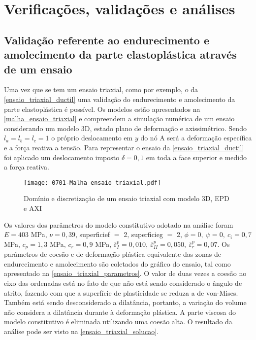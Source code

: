 \chapter{Verificações, validações e análises}\label{Algumas_verificacoes_validacoes}

\section{Validação referente ao endurecimento e amolecimento da parte elastoplástica através de um ensaio}

Uma vez que se tem um ensaio triaxial, como por exemplo, o da \autoref{ensaio_triaxial_ductil} uma validação do endurecimento e amolecimento da parte elastoplástica é possível. Os modelos estão apresentados na \autoref{malha_ensaio_triaxial} e compreendem a simulação numérica de um ensaio considerando um modelo 3D, estado plano de deformação e axissimétrico. Sendo $l_a = l_b = l_c = 1$ o próprio deslocamento em $y$ do nó A será a deformação específica e a força reativa a tensão. Para representar o ensaio da \autoref{ensaio_triaxial_ductil} foi aplicado um deslocamento imposto $\delta = 0,1$ em toda a face superior e medido a força reativa.

\begin{figure}[H]
	\begin{center}
		\texttt{[image: 0701-Malha\_ensaio\_triaxial.pdf]}
	\end{center}
	\caption{\label{malha_ensaio_triaxial}Domínio e discretização de um ensaio triaxial com modelo 3D, EPD e AXI}
\end{figure}

Os valores dos parâmetros do modelo constitutivo adotado na análise foram $E = 403$ MPa, $\nu = 0,39$,  superficief $=$ 2, superficieg $=$ 2, $\phi = 0,~\psi = 0,~c_i = 0,7$ MPa, $c_p = 1,3$ MPa, $c_r = 0,9$ MPa, $\bar \varepsilon^p_{I} = 0,010,~\bar \varepsilon^p_{II} = 0,050,~\bar \varepsilon^p_{r} = 0,07$. Os parâmetros de coesão e de deformação plástica equivalente das zonas de endurecimento e amolecimento são coletados do gráfico do ensaio, tal como apresentado na \autoref{ensaio_triaxial_parametros}. O valor de duas vezes a coesão no eixo das ordenadas está no fato de que não está sendo considerado o ângulo de atrito, fazendo com que a superfície de plasticidade se reduza a de von-Mises. Também está sendo desconsiderado a dilatância, portanto, a variação do volume não considera a dilatância durante à deformação plástica. A parte viscosa do modelo constitutivo é eliminada utilizando uma coesão alta. O resultado da análise pode ser visto na \autoref{ensaio_triaxial_solucao}.
 
